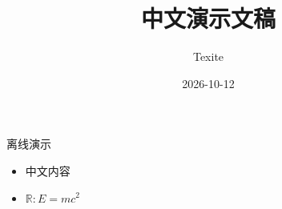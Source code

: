 \documentclass{beamer}
\title{中文演示文稿}\author{Texite}
\date{2026-10-12}
\begin{document}
\begin{frame}\titlepage\end{frame}
\begin{frame}{离线演示}\begin{itemize}\item 中文内容\item $\mathbb{R}: E=mc^2$\end{itemize}\end{frame}
\end{document}
